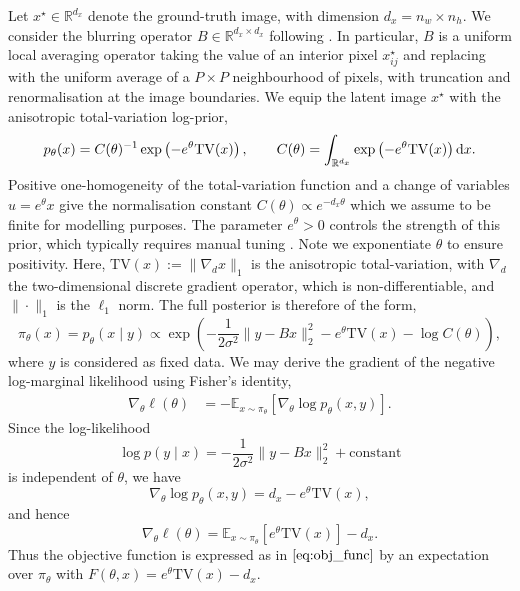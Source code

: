 Let $x^\star\in\mathbb{R}^{d_x}$ denote the ground-truth image, with dimension $d_x=n_w\times n_h$. We consider  the blurring operator $B\in\mathbb{R}^{d_x\times d_x}$ following \citet{encinar2025proximal}. In particular, $B$ is a uniform local averaging operator taking the value of an interior pixel $x^\star_{ij}$ and replacing with the uniform average of a $P\times P$ neighbourhood of pixels, with truncation and renormalisation at the image boundaries. We equip the latent image $x^\star$ with the anisotropic total-variation log-prior,
\begin{equation*}
    p_\theta(x)=C(\theta)^{-1}\exp\left(-e^{\theta}\mathrm{TV}(x)\right),\qquad C(\theta)=\int_{\mathbb{R}^{d_x}}\exp\left(-e^{\theta}\mathrm{TV}(x)\right)\mathrm{d} x.
\end{equation*}
Positive one-homogeneity of the total-variation function and a change of variables $u=e^\theta x$ give the normalisation constant $C(\theta)\propto e^{-d_x\theta}$ which we assume to be finite for modelling purposes. The parameter $e^\theta>0$ controls the strength of this prior, which typically requires manual tuning \citep{durmus2018efficient,goldman2022gradient}. Note we exponentiate $\theta$ to ensure positivity. Here, $\mathrm{TV}(x):=\|\nabla_dx\|_1$ is the anisotropic total-variation, with $\nabla_d$ the two-dimensional discrete gradient operator, which is non-differentiable, and $\|\cdot\|_1$ is the $\ell_1$ norm. The full posterior is therefore of the form,
\begin{equation*}
    \pi_\theta(x)=p_\theta(x\mid y)\propto\exp\left(-\frac{1}{2\sigma^2}\|y-Bx\|^2_2-e^\theta\mathrm{TV}(x)-\log C(\theta)\right),
\end{equation*}
where $y$ is considered as fixed data. We may derive the gradient of the negative log-marginal likelihood using Fisher's identity,
\begin{align*}
    \nabla_\theta\ell(\theta)
    &=
    -\mathbb{E}_{x\sim \pi_\theta}
    [\nabla_\theta\log p_\theta(x,y)] .
\end{align*}
Since the log-likelihood
\begin{equation*}
    \log p(y\mid x) = -\frac{1}{2\sigma^2}\|y-Bx\|^2_2 + \text{constant}
\end{equation*}
is independent of \(\theta\), we have
\begin{equation*}
    \nabla_\theta\log p_\theta(x,y)= d_x-e^\theta\mathrm{TV}(x),
\end{equation*}
and hence
\begin{equation*}
    \nabla_\theta\ell(\theta)
    =
    \mathbb{E}_{x\sim \pi_\theta}
    [e^\theta\mathrm{TV}(x)]-d_x .
\end{equation*}
Thus the objective function is expressed as in $\eqref{eq:obj_func}$ by an expectation over $\pi_\theta$ with $F(\theta,x)=e^{\theta}\mathrm{TV}(x)-d_x$.

